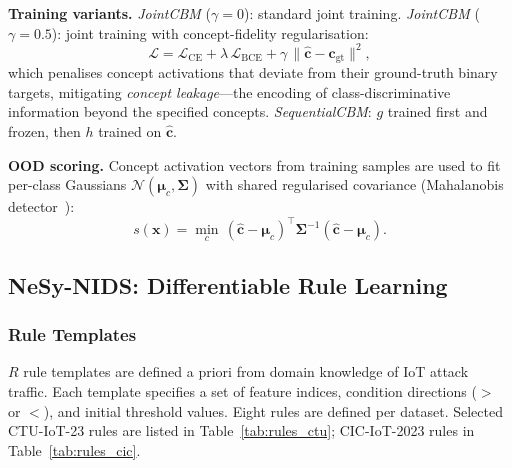 \documentclass[conference]{IEEEtran}
\begin{document}
\textbf{Training variants.}
\emph{JointCBM} ($\gamma{=}0$): standard joint training.
\emph{JointCBM} ($\gamma{=}0.5$): joint training with concept-fidelity
regularisation:
\begin{equation}
  \mathcal{L} = \mathcal{L}_{\text{CE}} + \lambda\,\mathcal{L}_{\text{BCE}}
    + \gamma\,\|\hat{\mathbf{c}} - \mathbf{c}_{\text{gt}}\|^2,
  \label{eq:cbm_loss}
\end{equation}
which penalises concept activations that deviate from their ground-truth
binary targets, mitigating \emph{concept leakage}---the encoding of
class-discriminative information beyond the specified concepts.
\emph{SequentialCBM}: $g$ trained first and frozen, then $h$ trained
on $\hat{\mathbf{c}}$.

\textbf{OOD scoring.}
Concept activation vectors from training samples are used to fit
per-class Gaussians $\mathcal{N}(\boldsymbol{\mu}_c,\boldsymbol{\Sigma})$
with shared regularised covariance (Mahalanobis
detector~\cite{lee2018simple,fort2021exploring}):
\begin{equation}
  s(\mathbf{x}) = \min_c\,(\hat{\mathbf{c}}-\boldsymbol{\mu}_c)^\top
  \boldsymbol{\Sigma}^{-1}(\hat{\mathbf{c}}-\boldsymbol{\mu}_c).
  \label{eq:mahal}
\end{equation}

\subsection{NeSy-NIDS: Differentiable Rule Learning}
\label{sec:nesy}

\subsubsection{Rule Templates}

$R$ rule templates are defined a priori from domain knowledge of IoT attack
traffic. Each template specifies a set of feature indices, condition
directions ($>$ or $<$), and initial threshold values.
Eight rules are defined per dataset. Selected CTU-IoT-23 rules are listed
in Table~\ref{tab:rules_ctu}; CIC-IoT-2023 rules in Table~\ref{tab:rules_cic}.
\end{document}
